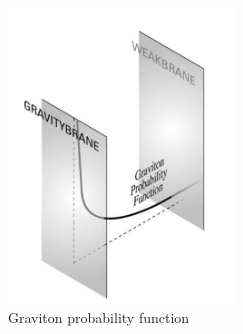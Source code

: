 \begin{figure}[H]
  \centering
\includegraphics[width=6cm]{SM_chapter_plots/RS}
\caption{Graviton probability function \label{RSfigure}}
\end{figure}

